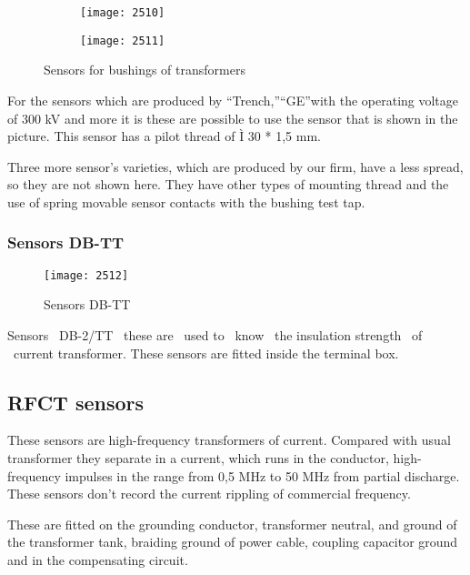 \begin{figure}[h!]
    \centering
    \begin{subfigure}[b]{0.49\textwidth}
        \centering
        \texttt{[image: 2510]}
    \end{subfigure}
    \begin{subfigure}[b]{0.49\textwidth}
        \centering
        \texttt{[image: 2511]}
    \end{subfigure}
    
    \caption{Sensors for bushings of transformers}
    \label{fig:Sensors for bushings of transformers}
\end{figure}

For the sensors which are produced by \textquotedblleft Trench,\textquotedblright \textquotedblleft GE\textquotedblright with the operating voltage of 300 kV and more it is these are possible to use the sensor that is shown in the picture. This sensor has a pilot thread of Ì 30 * 1,5 mm.

Three more sensor's varieties, which are produced by our firm, have a less spread, so they are not shown here. They have other types of mounting thread and the use of spring movable sensor contacts with the bushing test tap.

\subsubsection{Sensors DB-TT}
\begin{figure}[h!]
\centering
\texttt{[image: 2512]}
\caption{Sensors DB-TT}
\label{fig:Sensors DB-TT}
\end{figure}

Sensors ~DB-2/TT ~these are ~used to ~know ~the insulation strength ~of ~current transformer. These sensors are fitted inside the terminal box.

\subsection{RFCT sensors}
These sensors are high-frequency transformers of current. Compared with usual transformer they separate in a current, which runs in the conductor, high-frequency impulses in the range from 0,5 MHz to 50 MHz from partial discharge. These sensors don’t record the current rippling of commercial frequency\setlength{\parskip}{1em}.

These are fitted on the grounding conductor, transformer neutral, and ground of the transformer tank, braiding ground of power cable, coupling capacitor ground and in the compensating circuit. 

